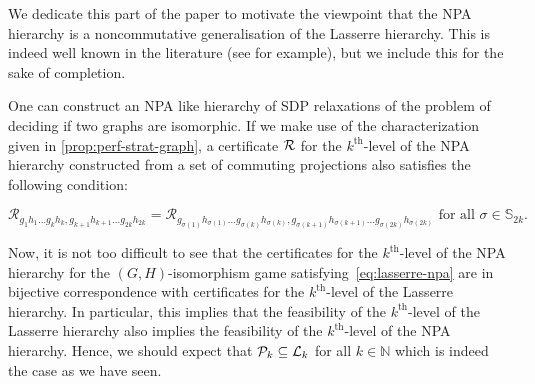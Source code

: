 \documentclass[a4paper,onecolumn,11pt,accepted=2026-01-06]{quantumarticle}
\theoremstyle{plain}
\theoremstyle{remark}
\theoremstyle{definition}
\def\calP{{\mathcal P}} \def\calQ{{\mathcal Q}} \def\calR{{\mathcal R}}
\begin{document}
  We dedicate this part of the paper to motivate the viewpoint that the NPA hierarchy is a noncommutative generalisation of the Lasserre hierarchy. This is indeed well known in the literature (see \cite{NPA-2, cstar-hierarchy} for example), but we include this for the sake of completion. 

  One can construct an NPA like hierarchy of SDP relaxations of the problem of deciding if two graphs are isomorphic. If we make use of the characterization given in \cref{prop:perf-strat-graph}, a certificate $\cal{R}$ for the $k^{\text{th}}$-level of the NPA hierarchy constructed from a set of commuting projections also satisfies the following condition:
  
  \begin{equation}\label{eq:lasserre-npa}
      \calR_{g_1h_1 \dots g_kh_k, g_{k+1}h_{k+1}\dots g_{2k}h_{2k} } = \calR_{g_{\sigma(1)}h_{\sigma(1)}\dots g_{\sigma(k)}h_{\sigma(k)}, g_{\sigma(k+1)}h_{\sigma(k+1)}\dots g_{\sigma(2k)}h_{\sigma(2k)}} \text{ for all } \sigma \in \mathbb{S}_{2k}. 
  \end{equation} 

  Now, it is not too difficult to see that the certificates for the $k^{\text{th}}$-level of the NPA hierarchy for the $(G,H)$-isomorphism game satisfying~\eqref{eq:lasserre-npa} are in bijective correspondence with certificates for the $k^{\text{th}}$-level of the Lasserre hierarchy. In particular, this implies that the feasibility of the $k^{\text{th}}$-level of the Lasserre hierarchy also implies the feasibility of the $k^{\text{th}}$-level of the NPA hierarchy. Hence, we should expect that $\calP_k \subseteq \calL_k$ for all $k \in \mathbb{N}$ which is indeed the case as we have seen. %
\end{document}
